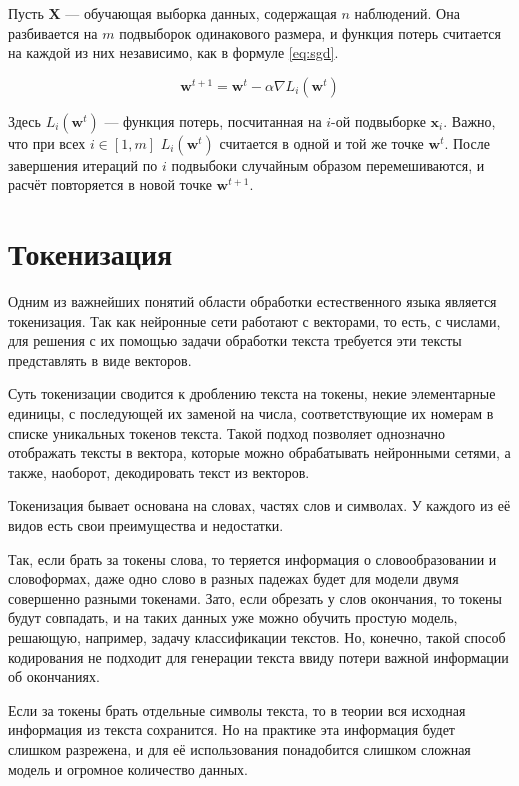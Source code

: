 Пусть $\mathbf{X}$ --- обучающая выборка данных, содержащая $n$ наблюдений. Она разбивается на $m$ подвыборок одинакового размера, и функция потерь считается на каждой из них независимо, как в формуле \ref*{eq:sgd}.

\begin{equation}
    \label{eq:sgd}
    \mathbf{w}^{t+1}=\mathbf{w}^t-\alpha \nabla L_i(\mathbf{w}^t)
\end{equation}

Здесь $L_i(\mathbf{w}^t)$ --- функция потерь, посчитанная на $i$-ой подвыборке $\mathbf{x}_i$. Важно, что при всех $i\in[1, m]$ $L_i(\mathbf{w}^t)$ считается в одной и той же точке $\mathbf{w}^t$. После завершения итераций по $i$ подвыбоки случайным образом перемешиваются, и расчёт повторяется в новой точке $\mathbf{w}^{t+1}$.

\section{Токенизация}

Одним из важнейших понятий области обработки естественного языка является токенизация. Так как нейронные сети работают с векторами, то есть, с числами, для решения с их помощью задачи обработки текста требуется эти тексты представлять в виде векторов.

Суть токенизации сводится к дроблению текста на токены, некие элементарные единицы, с последующей их заменой на числа, соответствующие их номерам в списке уникальных токенов текста. Такой подход позволяет однозначно отображать тексты в вектора, которые можно обрабатывать нейронными сетями, а также, наоборот, декодировать текст из векторов.

Токенизация бывает основана на словах, частях слов и символах. У каждого из её видов есть свои преимущества и недостатки.

Так, если брать за токены слова, то теряется информация о словообразовании и словоформах, даже одно слово в разных падежах будет для модели двумя совершенно разными токенами. Зато, если обрезать у слов окончания, то токены будут совпадать, и на таких данных уже можно обучить простую модель, решающую, например, задачу классификации текстов. Но, конечно, такой способ кодирования не подходит для генерации текста ввиду потери важной информации об окончаниях.

Если за токены брать отдельные символы текста, то в теории вся исходная информация из текста сохранится. Но на практике эта информация будет слишком разрежена, и для её использования понадобится слишком сложная модель и огромное количество данных.

